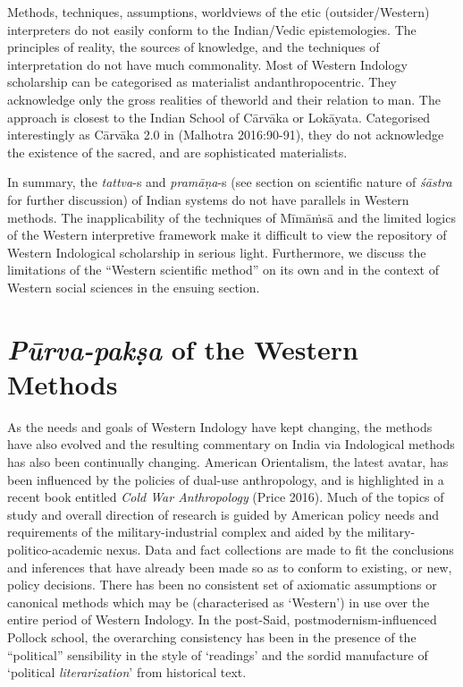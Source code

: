 Methods, techniques, assumptions, worldviews of the etic (outsider/\-Western) interpreters do not easily conform to the Indian/Vedic epistemologies. The principles of reality, the sources of knowledge, and the techniques of interpretation do not have much commonality. Most of Western Indology scholarship can be categorised as materialist and\break anthropocentric. They acknowledge only the gross realities of the\break world and their relation to man. The approach is closest to the Indian School of Cārvāka or Lokāyata. Categorised interestingly as Cārvāka 2.0 in (Malhotra 2016:90-91), they do not acknowledge the existence of the sacred, and are sophisticated materialists.

In summary, the {\sl tattva}-s and {\sl pramāṇa}-s (see section on scientific nature of {\sl śāstra} for further discussion) of Indian systems do not have parallels in Western methods. The inapplicability of the techniques of Mīmāṁsā and the limited logics of the Western interpretive framework make it difficult to view the repository of Western Indological scholarship in serious light. Furthermore, we discuss the limitations of the ``Western scientific method'' on its own and in the context of Western social sciences in the ensuing section.\\[-20pt]

\section*{{{\sl\bfseries Pūrva-pakṣa}\relax} of the Western Methods}

As the needs and goals of Western Indology have kept changing, the methods have also evolved and the resulting commentary on India via Indological methods has also been continually changing. American Orientalism, the latest avatar, has been influenced by the policies of dual-use anthropology, and is highlighted in a recent book entitled {\sl Cold War Anthropology} (Price 2016). Much of the topics of study and overall direction of research is guided by American policy needs and requirements of the military-industrial complex and aided by the military-politico-academic nexus. Data and fact collections are made to fit the conclusions and inferences that have already been made so as to conform to existing, or new, policy decisions. There has been no consistent set of axiomatic assumptions or canonical methods which may be (characterised as `Western') in use over the entire period of Western Indology. In the post-Said, postmodernism-influenced Pollock school, the overarching consistency has been in the presence of the ``political'' sensibility in the style of `readings' and the sordid manufacture of `political {\sl literarization}' from historical text.

